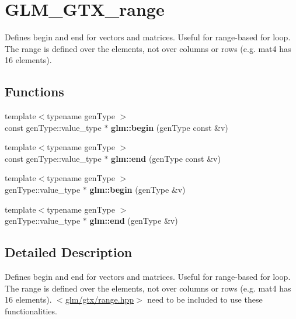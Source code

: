 \hypertarget{group__gtx__range}{\section{G\-L\-M\-\_\-\-G\-T\-X\-\_\-range}
\label{group__gtx__range}
}


Defines begin and end for vectors and matrices. Useful for range-\/based for loop. The range is defined over the elements, not over columns or rows (e.\-g. mat4 has 16 elements).  


\subsection*{Functions}
\begin{DoxyCompactItemize}
\item 
\hypertarget{group__gtx__range_ga774c16a37371658a2a1540faf9122839}{{\footnotesize template$<$typename gen\-Type $>$ }\\const gen\-Type\-::value\-\_\-type $\ast$ {\bfseries glm\-::begin} (gen\-Type const \&v)}\label{group__gtx__range_ga774c16a37371658a2a1540faf9122839}

\item 
\hypertarget{group__gtx__range_ga97ffec4ea7e07302f11befff9cb37acd}{{\footnotesize template$<$typename gen\-Type $>$ }\\const gen\-Type\-::value\-\_\-type $\ast$ {\bfseries glm\-::end} (gen\-Type const \&v)}\label{group__gtx__range_ga97ffec4ea7e07302f11befff9cb37acd}

\item 
\hypertarget{group__gtx__range_gacc3851df89b9238430e39525c3518ced}{{\footnotesize template$<$typename gen\-Type $>$ }\\gen\-Type\-::value\-\_\-type $\ast$ {\bfseries glm\-::begin} (gen\-Type \&v)}\label{group__gtx__range_gacc3851df89b9238430e39525c3518ced}

\item 
\hypertarget{group__gtx__range_ga0c303e8c522b139252646a93d5e490d4}{{\footnotesize template$<$typename gen\-Type $>$ }\\gen\-Type\-::value\-\_\-type $\ast$ {\bfseries glm\-::end} (gen\-Type \&v)}\label{group__gtx__range_ga0c303e8c522b139252646a93d5e490d4}

\end{DoxyCompactItemize}


\subsection{Detailed Description}
Defines begin and end for vectors and matrices. Useful for range-\/based for loop. The range is defined over the elements, not over columns or rows (e.\-g. mat4 has 16 elements). $<$\hyperlink{range_8hpp}{glm/gtx/range.\-hpp}$>$ need to be included to use these functionalities. 